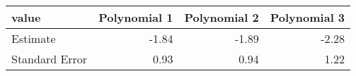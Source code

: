 \begin{tabular}{lrrr}
  \hline
value & Polynomial 1 & Polynomial 2 & Polynomial 3 \\ 
  \hline
Estimate & -1.84 & -1.89 & -2.28 \\ 
  Standard Error & 0.93 & 0.94 & 1.22 \\ 
   \hline
\end{tabular}
